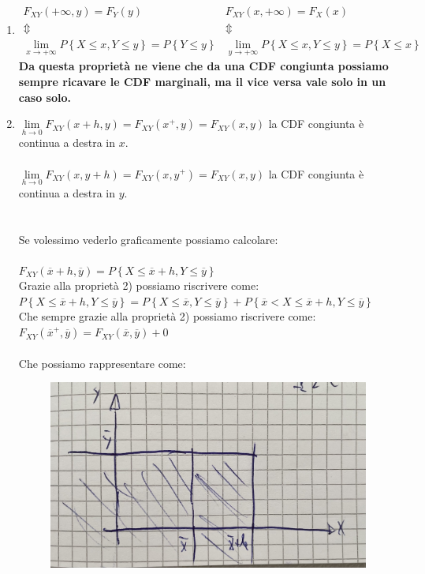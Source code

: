 \documentclass{article}
\begin{document}
\begin{enumerate}
    \item $\begin{matrix}
    F_{XY}(+\infty, y) = F_Y(y) & F_{XY}(x, +\infty) = F_X(x) \\
    \Updownarrow & \Updownarrow \\
    \underset{x \to +\infty}{\lim} P\left\{ X \leq x, Y \leq y \right\} = P \left\{ Y \leq y\right\} & 
    \underset{y \to +\infty}{\lim} P\left\{ X \leq x, Y \leq y \right\} = P \left\{ X \leq x\right\}
    \end{matrix}$ \\
    \textbf{Da questa proprietà ne viene che da una CDF congiunta possiamo sempre ricavare le CDF marginali, ma il vice versa vale solo in un caso solo.}
    \item $\underset{h \to 0}{\lim} F_{XY}(x+h,y) = F_{XY}(x^+,y) = F_{XY}(x,y)$ la CDF congiunta è continua a destra in $x$. \\ \\
    $\underset{h \to 0}{\lim} F_{XY}(x,y+h) = F_{XY}(x,y^+) = F_{XY}(x,y)$ la CDF congiunta è continua a destra in $y$. \\ \\ \\
    Se volessimo vederlo graficamente possiamo calcolare: \\ \\
    $F_{XY}(\overline x +h , \overline y) = P \left\{X \leq \overline x +h, Y \leq \overline y\right\}$ \\
    Grazie alla proprietà 2) possiamo riscrivere come: \\
    $P \left\{X \leq \overline x + h, Y \leq \overline y \right\} = P \left\{X \leq \overline x, Y \leq \overline y \right\} + P\left\{ \overline x < X \leq \overline x + h, Y \leq \overline y\right\}$ \\
    Che sempre grazie alla proprietà 2) possiamo riscrivere come: \\
    $F_{XY} (\overline x ^+, \overline y ) = F_{XY}(\overline x, \overline y) + 0$ \\ \\
    Che possiamo rappresentare come: 
    \begin{figure}[ht]
    \centering
    \includegraphics[scale=0.20]{images/72.Prop6CDFVettA.jpeg}

\end{figure}
\end{enumerate}
\end{document}
